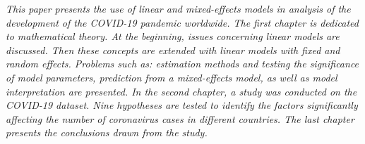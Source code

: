 \documentclass[12pt]{mwbk}
\theoremstyle{plain}
\theoremstyle{definition}
\theoremstyle{definition}
\begin{document}
{\it
This paper presents the use of linear and mixed-effects models in analysis of the development of the COVID-19 pandemic worldwide. The first chapter is dedicated to mathematical theory. At the beginning, issues concerning linear models are discussed. Then these concepts are extended with linear models with fixed and random effects. Problems such as: estimation methods and testing the significance of model parameters, prediction from a mixed-effects model, as well as model interpretation are presented. In the second chapter, a study was conducted on the COVID-19 dataset. Nine hypotheses are tested to identify the factors significantly affecting the number of coronavirus cases in different countries. The last chapter presents the conclusions drawn from the study.

}
\end{document}
